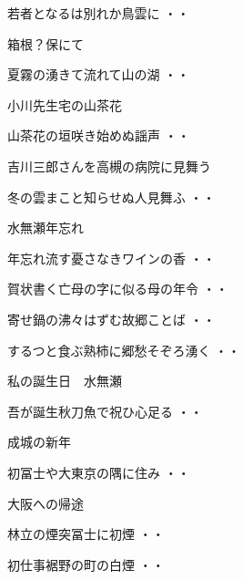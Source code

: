 \begin{shiika}若者となるは別れか鳥雲に
\hfill{・・}\end{shiika}
\vspace{0.6cm}
箱根？保にて
\begin{shiika}夏霧の湧きて流れて山の湖
\hfill{・・}\end{shiika}
\vspace{0.6cm}
小川先生宅の山茶花
\begin{shiika}山茶花の垣咲き始めぬ謡声
\hfill{・・}\end{shiika}
\vspace{0.6cm}
吉川三郎さんを高槻の病院に見舞う
\begin{shiika}冬の雲まこと知らせぬ人見舞ふ
\hfill{・・}\end{shiika}
\vspace{0.6cm}
水無瀬年忘れ
\begin{shiika}年忘れ流す憂さなきワインの香
\hfill{・・}\end{shiika}
\begin{shiika}賀状書く亡母の字に似る母の年令
\hfill{・・}\end{shiika}
\begin{shiika}寄せ鍋の沸々はずむ故郷ことば
\hfill{・・}\end{shiika}
\begin{shiika}するつと食ぶ熟柿に郷愁そぞろ湧く
\hfill{・・}\end{shiika}
\vspace{0.6cm}
私の誕生日　水無瀬
\begin{shiika}吾が誕生秋刀魚で祝ひ心足る
\hfill{・・}\end{shiika}
\vspace{0.6cm}
成城の新年
\begin{shiika}初冨士や大東京の隅に住み
\hfill{・・}\end{shiika}
\vspace{0.6cm}
大阪への帰途
\begin{shiika}林立の煙突冨士に初煙
\hfill{・・}\end{shiika}
\begin{shiika}初仕事裾野の町の白煙
\hfill{・・}\end{shiika}
